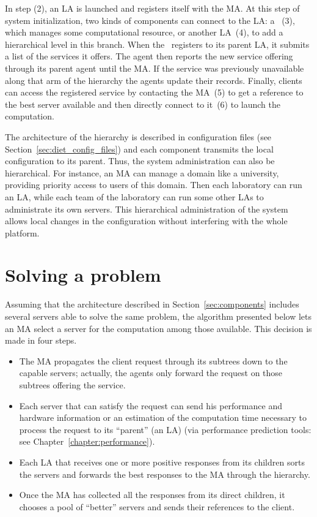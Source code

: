 In step (2), an LA is launched and registers itself with the MA.  At this step
of system initialization, two kinds of components can connect to the LA: a \sed
~(3), which manages some computational resource, or another LA~(4), to add a
hierarchical level in this branch. When the \sed\ registers to its parent LA,
it submits a list of the services it offers.  The agent then reports the new
service offering through its parent agent until the MA.  If the service was
previously unavailable along that arm of the hierarchy the agents update their
records.  Finally, clients can access the registered service by contacting the
MA~(5) to get a reference to the best server available and then directly
connect to it~(6) to launch the computation.

The architecture of the hierarchy is described in configuration files (see
Section~\ref{sec:diet_config_files}) and each component transmits the local
configuration to its parent. Thus, the system administration can also be
hierarchical. For instance, an MA can manage a domain like a university,
providing priority access to users of this domain. Then each laboratory can
run an LA, while each team of the laboratory can run some other LAs to
administrate its own servers. This hierarchical administration of the system
allows local changes in the configuration without interfering with the whole
platform.



\section{Solving a problem}
\label{sec:solvepb}

Assuming that the architecture described in Section~\ref{sec:components}
includes several servers able to solve the same problem, the algorithm
presented below lets an MA select a server for the computation among those
available. This decision is made in four steps.

\begin{itemize}
\item The MA propagates the client request through its subtrees down to the
  capable servers; actually, the agents only forward the request on those
  subtrees offering the service.
\item Each server that can satisfy the request can send his performance and
  hardware information or  an estimation of  the computation time necessary to
  process the request to its ``parent'' (an LA) (via performance prediction
  tools: see Chapter~\ref{chapter:performance}). 
\item Each LA that receives one or more positive responses from its children
  sorts the servers and forwards the best responses to the MA through the
  hierarchy.
\item Once the MA has collected all the responses from its direct children, it
  chooses a pool of ``better'' servers and sends their references to the client.
\end{itemize}

